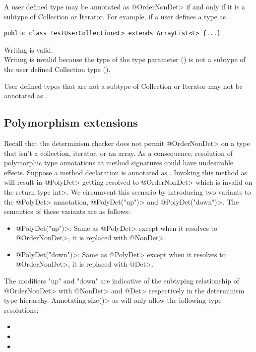 A user defined type may be annotated as \<@OrderNonDet> if and only if it
is a subtype of Collection or Iterator.
For example, if a user defines a type as
\begin{verbatim}
public class TestUserCollection<E> extends ArrayList<E> {...}
\end{verbatim}
Writing  is valid.\\
Writing  is invalid
because the type of the type parameter () is not a subtype
of the user defined Collection type ().

User defined types that are not a subtype of Collection or Iterator
may not be annotated as .

\subsection{Polymorphism extensions}\label{polymorphism-extensions}

Recall that the determinism checker does not permit \<@OrderNonDet> on a type that isn't a collection, iterator, or an array.
As a consequence, resolution of polymorphic type annotations at method signatures could have undesirable effects.
Suppose a method declaration is annotated as . Invoking this method
as  will result in \<@PolyDet> getting resolved to \<@OrderNonDet> which is invalid
on the return type \<int>. We circumvent this scenario by introducing two variants to the \<@PolyDet> annotation, \<@PolyDet("up")>
and \<@PolyDet("down")>. The semantics of these variants are as follows:
\begin{itemize}
    \item \<@PolyDet("up")>: Same as \<@PolyDet> except when it resolves to \<@OrderNonDet>, it is replaced with \<@NonDet>.
    \item \<@PolyDet("down")>: Same as \<@PolyDet> except when it resolves to \<@OrderNonDet>, it is replaced with \<@Det>.
\end{itemize} 
The modifiers "up" and "down" are indicative of the subtyping relationship of \<@OrderNonDet> with \<@NonDet> and \<@Det> respectively
in the determinism type hierarchy.
Annotating \<size()> as  will only allow the following type resolutions:
\begin{itemize}
    \item {}
    \item {}
    \item {}
\end{itemize}

